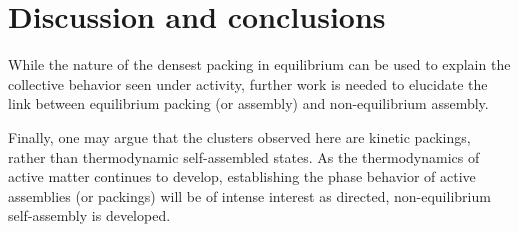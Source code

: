 \section*{Discussion and conclusions}

While the nature of the densest packing in equilibrium can be used to explain the collective behavior seen under activity, further work is needed to elucidate the link between equilibrium packing (or assembly) and non-equilibrium assembly.

Finally, one may argue that the clusters observed here are kinetic packings, rather than thermodynamic self-assembled states.
As the thermodynamics of active matter continues to develop, establishing the phase behavior of active assemblies (or packings) will be of intense interest as directed, non-equilibrium self-assembly is developed.